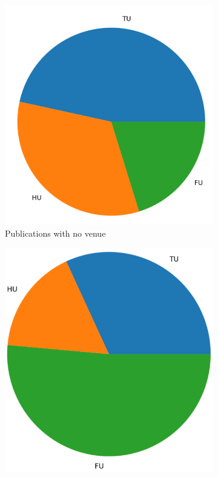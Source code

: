 \begin{figure}
  \begin{subfigure}[t]{0.45\textwidth}
    \centering
    \includegraphics[width=\textwidth]{figures/repository_analysis/pubs_with_no_venue.PNG}
    \caption{Publications with no venue}
    \label{fig:pubs_with_no_venue}
  \end{subfigure}
  \hfill
  \begin{subfigure}[t]{0.41\textwidth}
    \centering
    \includegraphics[width=\textwidth]{figures/repository_analysis/pubs_venue_alone.PNG}

\end{subfigure}
\end{figure}
